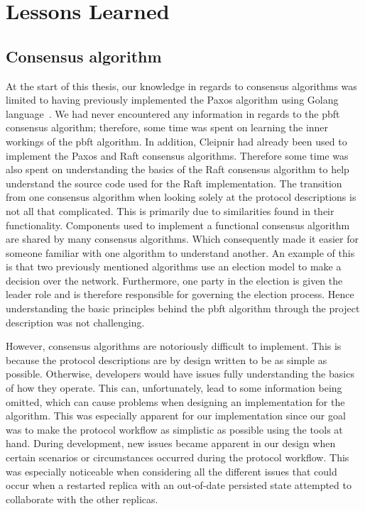 \section{Lessons Learned}
\subsection{Consensus algorithm}

At the start of this thesis, our knowledge in regards to consensus algorithms was limited to having previously implemented the Paxos algorithm using Golang language~\cite{WEB:golangmainpage}. We had never encountered any information in regards to the \ac{pbft} consensus algorithm; therefore, some time was spent on learning the inner workings of the \ac{pbft} algorithm. In addition, Cleipnir had already been used to implement the Paxos and Raft consensus algorithms. Therefore some time was also spent on understanding the basics of the Raft consensus algorithm to help understand the source code used for the Raft implementation. The transition from one consensus algorithm when looking solely at the protocol descriptions is not all that complicated. This is primarily due to similarities found in their functionality. Components used to implement a functional consensus algorithm are shared by many consensus algorithms. Which consequently made it easier for someone familiar with one algorithm to understand another.
An example of this is that two previously mentioned algorithms use an election model to make a decision over the network. Furthermore, one party in the election is given the leader role and is therefore responsible for governing the election process. Hence understanding the basic principles behind the \ac{pbft} algorithm through the project description was not challenging.

However, consensus algorithms are notoriously difficult to implement. This is because the protocol descriptions are by design written to be as simple as possible. Otherwise, developers would have issues fully understanding the basics of how they operate. This can, unfortunately, lead to some information being omitted, which can cause problems when designing an implementation for the algorithm. This was especially apparent for our implementation since our goal was to make the protocol workflow as simplistic as possible using the tools at hand. During development, new issues became apparent in our design when certain scenarios or circumstances occurred during the protocol workflow. This was especially noticeable when considering all the different issues that could occur when a restarted replica with an out-of-date persisted state attempted to collaborate with the other replicas.

